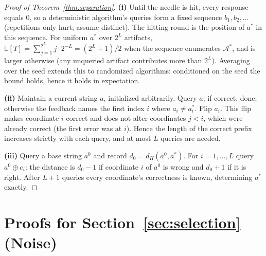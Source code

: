 \documentclass{article}
\theoremstyle{plain}
\theoremstyle{definition}
\theoremstyle{remark}
\newcommand{\A}{\mathcal{A}}
\newcommand{\E}{\mathbb{E}}
\begin{document}
\begin{proof}[Proof of Theorem~\ref{thm:separation}]
\textbf{(i)} Until the needle is hit, every response equals $0$, so a deterministic algorithm's queries form a fixed sequence $b_1, b_2, \dots$ (repetitions only hurt; assume distinct). The hitting round is the position of $a^*$ in this sequence. For uniform $a^*$ over $2^L$ artifacts, $\E[T] = \sum_{j=1}^{2^L} j \cdot 2^{-L} = (2^L+1)/2$ when the sequence enumerates $\A^*$, and is larger otherwise (any unqueried artifact contributes more than $2^L$). Averaging over the seed extends this to randomized algorithms: conditioned on the seed the bound holds, hence it holds in expectation.

\textbf{(ii)} Maintain a current string $a$, initialized arbitrarily. Query $a$; if correct, done; otherwise the feedback names the first index $i$ where $a_i \ne a^*_i$. Flip $a_i$. This flip makes coordinate $i$ correct and does not alter coordinates $j < i$, which were already correct (the first error was at $i$). Hence the length of the correct prefix increases strictly with each query, and at most $L$ queries are needed.

\textbf{(iii)} Query a base string $a^0$ and record $d_0 = d_H(a^0, a^*)$. For $i = 1, \dots, L$ query $a^0 \oplus e_i$: the distance is $d_0 - 1$ if coordinate $i$ of $a^0$ is wrong and $d_0 + 1$ if it is right. After $L+1$ queries every coordinate's correctness is known, determining $a^*$ exactly.
\end{proof}

\section{Proofs for Section~\ref{sec:selection} (Noise)}
\label{app:noise}
\end{document}
